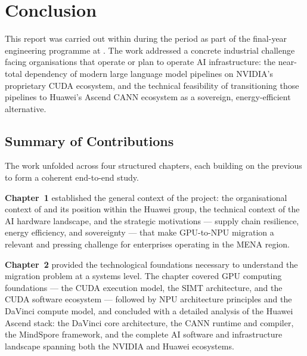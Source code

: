 
\chapter*{Conclusion}

This report was carried out within \CompanyName{} during the period
\InternshipPeriod{} as part of the final-year engineering programme
at \FacultyName{}. The work addressed a concrete industrial challenge
facing organisations that operate or plan to operate AI infrastructure:
the near-total dependency of modern large language model pipelines on
NVIDIA's proprietary CUDA ecosystem, and the technical feasibility of
transitioning those pipelines to Huawei's Ascend CANN ecosystem as a
sovereign, energy-efficient alternative.

\section*{Summary of Contributions}

The work unfolded across four structured chapters, each building
on the previous to form a coherent end-to-end study.

\textbf{Chapter~1} established the general context of the project:
the organisational context of \CompanyName{} and its position within
the Huawei group, the technical context of the AI hardware landscape,
and the strategic motivations — supply chain resilience, energy
efficiency, and sovereignty — that make GPU-to-NPU migration a
relevant and pressing challenge for enterprises operating in the
MENA region.

\textbf{Chapter~2} provided the technological foundations necessary
to understand the migration problem at a systems level. The chapter
covered GPU computing foundations — the CUDA execution model,
the SIMT architecture, and the CUDA software ecosystem — followed
by NPU architecture principles and the DaVinci compute model, and
concluded with a detailed analysis of the Huawei Ascend stack:
the DaVinci core architecture, the CANN runtime and compiler,
the MindSpore framework, and the complete AI software and
infrastructure landscape spanning both the NVIDIA and Huawei
ecosystems.

